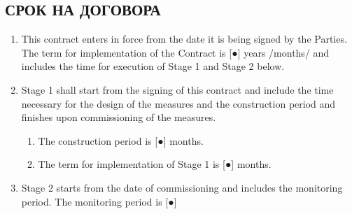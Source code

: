 \subsection{СРОК НА ДОГОВОРА}
\begin{enumerate}
\item This contract enters in force from the date it is being signed
  by the Parties. The term for implementation of the Contract is [●]
  years /months/ and includes the time for execution of Stage 1 and
  Stage 2 below.
\item Stage 1 shall start from the signing of this contract and
  include the time necessary for the design of the measures and the
  construction period and finishes upon commissioning of the measures.
  \begin{enumerate}
  \item The construction period is [●] months.
  \item The term for implementation of Stage 1 is [●] months.
  \end{enumerate}
\item Stage 2 starts from the date of commissioning and includes the
  monitoring period. The monitoring period is [●]
\end{enumerate}

